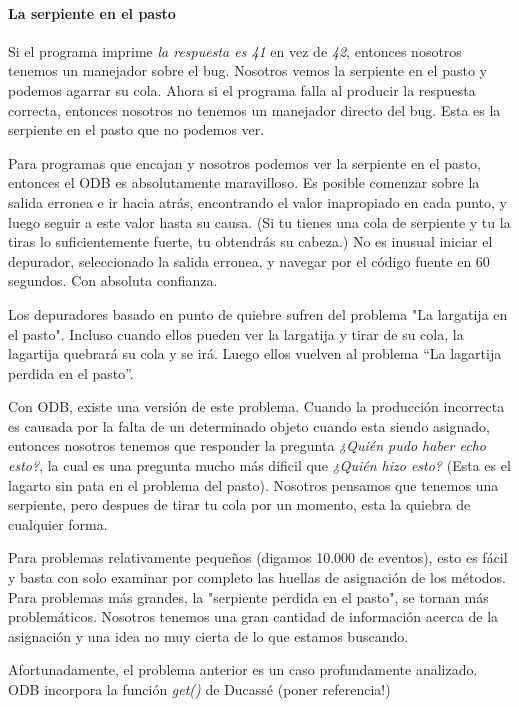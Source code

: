 \documentclass[12pt,a4paper]{report}
\begin{document}
				\paragraph{La serpiente en el pasto}

Si el programa imprime \textit{la respuesta es 41} en vez de \textit{42}, entonces nosotros tenemos un manejador sobre el bug.  Nosotros vemos la serpiente en el pasto y podemos agarrar su cola.  Ahora si el programa falla al producir la respuesta correcta, entonces nosotros no tenemos un manejador directo del bug.  Esta es la serpiente en el pasto que no podemos ver.

Para programas que encajan y nosotros podemos ver la serpiente en el pasto, entonces el ODB es absolutamente maravilloso.  Es posible comenzar sobre la salida erronea e ir hacia atrás, encontrando el valor inapropiado en cada punto, y luego seguir a este valor hasta su causa. (Si tu tienes una cola de serpiente y tu la tiras lo suficientemente fuerte, tu obtendrás su cabeza.)  No es inusual iniciar el depurador, seleccionado la salida erronea, y navegar por el código fuente en 60 segundos. Con absoluta confianza.

Los depuradores basado en punto de quiebre sufren del problema "La largatija en el pasto".  Incluso cuando ellos pueden ver la largatija y tirar de su cola, la lagartija quebrará su cola y se irá.  Luego ellos vuelven al problema “La lagartija perdida en el pasto”.

Con ODB, existe una versión de este problema.  Cuando la producción incorrecta es causada por la falta de un determinado objeto cuando esta siendo asignado, entonces nosotros tenemos que responder la pregunta \textit{¿Quién pudo haber echo esto?}, la cual es una pregunta mucho más dificil que \textit{¿Quién hizo esto?} (Esta es el lagarto sin pata en el problema del pasto).  Nosotros pensamos que tenemos una serpiente, pero despues de tirar tu cola por un momento, esta la quiebra de cualquier forma.

Para problemas relativamente pequeños (digamos 10.000 de eventos), esto es fácil y basta con solo examinar por completo las huellas de asignación de los métodos.  Para problemas más grandes, la "serpiente perdida en el pasto", se tornan más problemáticos.  Nosotros tenemos una gran cantidad de información acerca de la asignación y una idea no muy cierta de lo que estamos buscando.

Afortunadamente, el problema anterior es un caso profundamente analizado.  ODB incorpora la función \textit{get()} de Ducassé (poner referencia!)
\end{document}
